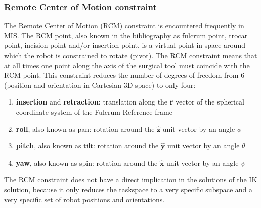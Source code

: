 \subsubsection{Remote Center of Motion constraint}
\label{rcm-subsubsection}

The Remote Center of Motion (RCM) constraint is encountered frequently in MIS. The RCM point, also known in the bibliography as fulcrum point, trocar point, incision point and/or insertion point, is a virtual point in space around which the robot is constrained to rotate (pivot). The RCM constraint means that at all times one point along the axis of the surgical tool must coincide with the RCM point. This constraint reduces the number of degrees of freedom from 6 (position and orientation in Cartesian 3D space) to only four:
\begin{enumerate}
\item \textbf{insertion} and \textbf{retraction}: translation along the $\mathbf{\hat{r}}$ vector of the spherical coordinate system of the Fulcrum Reference frame
\item \textbf{roll}, also known as pan: rotation around the $\mathbf{\hat{z}}$ unit vector by an angle $\phi$
\item \textbf{pitch}, also known as tilt: rotation around the $\mathbf{\hat{y}}$ unit vector by an angle $\theta$
\item \textbf{yaw}, also known as spin: rotation around the $\mathbf{\hat{x}}$ unit vector by an angle $\psi$
\end{enumerate}
The RCM constraint does not have a direct implication in the solutions of the IK solution, because it only reduces the taskspace to a very specific subspace and a very specific set of robot positions and orientations.

